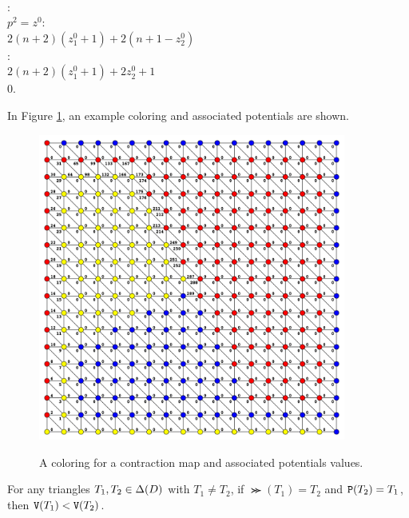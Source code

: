 \begin{algo}
    \\    \ElseB:\quad{}\+
    \\      \IfB $p^2 = z^0$:\quad{}\+
    \\        \ReturnB $2(n+2)(z^0_1 + 1) + 2(n+1-z^0_2)$\-
    \\      \ElseB:\quad{}\+
    \\        \ReturnB $2(n+2)(z^0_1 + 1) + 2z^0_2 + 1$\-\-\-
    \\  \ReturnB $0$\quad{}. 
  \end{algo}

  In Figure \ref{fig:potentials}, an example coloring and associated potentials are shown.
  \begin{figure}[h]
    \caption{A coloring for a contraction map and associated potentials values.}
    \centering
    \includegraphics[width=0.9\textwidth]{ContractionToEOPL_example1_potentials}
    \label{fig:potentials}
  \end{figure}

  \begin{lemma} \label{lemma:PotentialsIncreaseAlongPaths}
    For any triangles $T_1,T_2 \in \Delta(D)$ with $T_1 \neq T_2$, if $\Succ(T_1) = T_2$ and $\operatorname{\texttt{P}}(T_2) = T_1$, then $\operatorname{\texttt{V}}(T_1) < \operatorname{\texttt{V}}(T_2)$. 
  \end{lemma}

